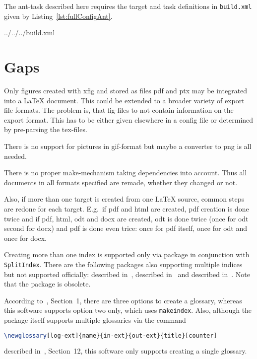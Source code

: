 \documentclass[12pt]{book}
\newcommand{\gls}[1]{#1}
\begin{document}
The ant-task described here 
requires the target and task definitions in \texttt{build.xml}
given by Listing~\ref{lst:fullConfigAnt}. 


{../../../build.xml}%



\chapter{Gaps}\label{chap:gaps}

Only figures created with xfig and stored as files pdf and ptx 
may be integrated into a \LaTeX{} document. 
This could be extended to a broader variety of export file formats. 
The problem is, that fig-files to not contain information on the export
format. 
This has to be either given elsewhere in a config file 
or determined by pre-parsing the tex-files. 

There is no support for pictures in \gls{gif}-format 
but maybe a converter to \gls{png} is all needed. 

There is no proper make-mechanism taking dependencies into account. 
Thus all documents in all formats specified are remade, 
whether they changed or not. 

Also, if more than one target is created from one \LaTeX{} source, 
common steps are redone for each target. 
E.g.~if pdf and html are created, 
pdf creation is done twice and if pdf, html, odt and docx are created, 
odt is done twice (once for odt second for docx) 
and pdf is done even trice: 
once for pdf itself, once for odt and once for docx. 

Creating more than one index is supported only 
via package  in conjunction with \texttt{SplitIndex}. 
There are the following packages also supporting multiple indices 
but not supported officially: 
 described in~\cite{IndexP}, 
 described in~\cite{AmsmidxP} and 
 described in~\cite{ImakeidxP}.
Note that the package  is obsolete. 

According to~\cite{GloP}, Section~1, 
there are three options to create a glossary, 
whereas this software supports option two only, 
which uses \texttt{makeindex}. 
Also, although the package  itself 
supports multiple glossaries via the command
%
\begin{lstlisting}[language=TeX, basicstyle=\small]
\newglossary[log-ext]{name}{in-ext}{out-ext}{title}[counter]
\end{lstlisting}
%
described in~\cite{GloP}, Section~12, 
this software only supports creating a single glossary. 
\end{document}

